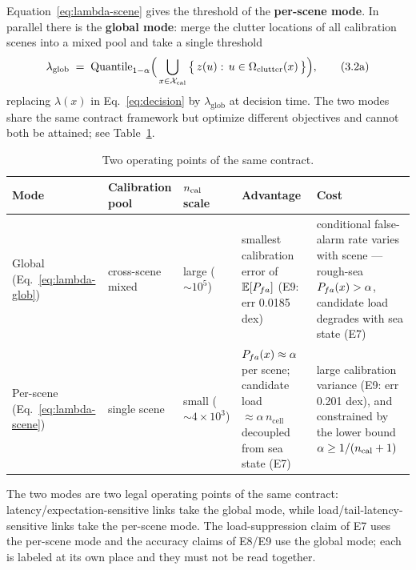 Equation~\eqref{eq:lambda-scene} gives the threshold of the \textbf{per-scene mode}.
In parallel there is the \textbf{global mode}: merge the clutter locations of all calibration scenes into a mixed pool and take a single threshold
\begin{equation}
\lambda_{\mathrm{glob}} \;=\; \mathrm{Quantile}_{1-\alpha}\Big(\bigcup_{x\in\mathcal{X}_{\mathrm{cal}}}\big\{\,z(u):\,u\in\Omega_{\mathrm{clutter}}(x)\,\big\}\Big),
\tag{3.2a}
\label{eq:lambda-glob}
\end{equation}
replacing $\lambda(x)$ in Eq.~\eqref{eq:decision} by $\lambda_{\mathrm{glob}}$ at decision time.
The two modes share the same contract framework but optimize different objectives and cannot both be attained; see Table~\ref{tab:modes}.

\begin{table}[htbp]
\centering
\caption{Two operating points of the same contract.}
\label{tab:modes}
\small
\begin{tabular}{p{2.2cm}p{1.6cm}p{1.9cm}p{4.1cm}p{4.3cm}}
\toprule
Mode & Calibration pool & $n_{\mathrm{cal}}$ scale & Advantage & Cost \\
\midrule
Global (Eq.~\eqref{eq:lambda-glob}) & cross-scene mixed & large ($\sim10^{5}$) & smallest calibration error of $\mathbb{E}[P_{fa}]$ (E9: err 0.0185 dex) & conditional false-alarm rate varies with scene --- rough-sea $P_{fa}(x)>\alpha$, candidate load degrades with sea state (E7) \\
Per-scene (Eq.~\eqref{eq:lambda-scene}) & single scene & small ($\sim4\times10^{3}$) & $P_{fa}(x)\approx\alpha$ per scene; candidate load $\approx\alpha\,n_{\mathrm{cell}}$ decoupled from sea state (E7) & large calibration variance (E9: err 0.201 dex), and constrained by the lower bound $\alpha\ge 1/(n_{\mathrm{cal}}+1)$ \\
\bottomrule
\end{tabular}
\end{table}

The two modes are two legal operating points of the same contract: latency/expectation-sensitive links take the global mode, while load/tail-latency-sensitive links take the per-scene mode.
The load-suppression claim of E7 uses the per-scene mode and the accuracy claims of E8/E9 use the global mode; each is labeled at its own place and they must not be read together.

